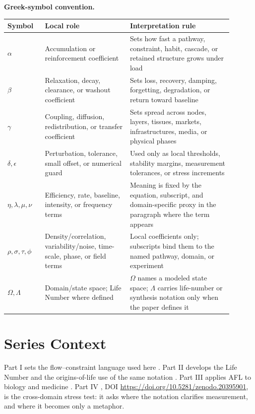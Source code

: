 \documentclass[11pt]{article}
\begin{document}
\noindent\textbf{Greek-symbol convention.}
\begin{center}
{\small
\begin{tabular}{p{0.15\linewidth}p{0.34\linewidth}p{0.41\linewidth}}
\hline
Symbol & Local role & Interpretation rule \\
\hline
$\alpha$ & Accumulation or reinforcement coefficient & Sets how fast a pathway, constraint, habit, cascade, or retained structure grows under load \\
$\beta$ & Relaxation, decay, clearance, or washout coefficient & Sets loss, recovery, damping, forgetting, degradation, or return toward baseline \\
$\gamma$ & Coupling, diffusion, redistribution, or transfer coefficient & Sets spread across nodes, layers, tissues, markets, infrastructures, media, or physical phases \\
$\delta,\epsilon$ & Perturbation, tolerance, small offset, or numerical guard & Used only as local thresholds, stability margins, measurement tolerances, or stress increments \\
$\eta,\lambda,\mu,\nu$ & Efficiency, rate, baseline, intensity, or frequency terms & Meaning is fixed by the equation, subscript, and domain-specific proxy in the paragraph where the term appears \\
$\rho,\sigma,\tau,\phi$ & Density/correlation, variability/noise, time-scale, phase, or field terms & Local coefficients only; subscripts bind them to the named pathway, domain, or experiment \\
$\Omega,\Lambda$ & Domain/state space; Life Number where defined & $\Omega$ names a modeled state space; $\Lambda$ carries life-number or synthesis notation only when the paper defines it \\
\hline
\end{tabular}
}
\end{center}


\section{Series Context}

Part I sets the flow--constraint language used here \cite{MujjabiPartI2026}. Part II develops the Life Number and the origins-of-life use of the same notation \cite{MujjabiPartII2026}. Part III applies AFL to biology and medicine \cite{MujjabiPartIII2026}. Part IV \cite{MujjabiPartIV2026}, DOI \url{https://doi.org/10.5281/zenodo.20395901}, is the cross-domain stress test: it asks where the notation clarifies measurement, and where it becomes only a metaphor.
\end{document}
